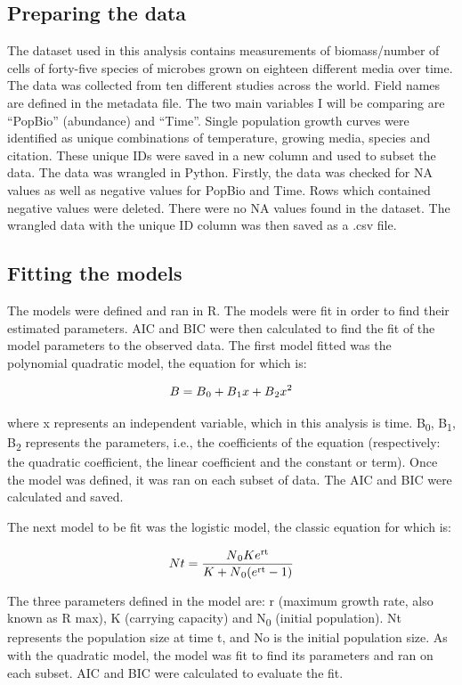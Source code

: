 \documentclass{article}
\begin{document}
\begin{flushleft}
\subsection{Preparing the data}
The dataset used in this analysis contains measurements of biomass/number of cells of forty-five species of microbes grown on eighteen different media over time. The data was collected from ten different studies across the world. Field names are defined in the metadata file. The two main variables I will be comparing are “PopBio” (abundance) and “Time”. Single population growth curves were identified as unique combinations of temperature, growing media, species and citation. These unique IDs were saved in a new column and used to subset the data. The data was wrangled in Python. Firstly, the data was checked for NA values as well as negative values for PopBio and Time. Rows which contained negative values were deleted. There were no NA values found in the dataset. The wrangled data with the unique ID column was then saved as a .csv file.
\linebreak

\subsection{Fitting the models}
The models were defined and ran in R. The models were fit in order to find their estimated parameters. AIC and BIC were then calculated to find the fit of the model parameters to the observed data. The first model fitted was the polynomial quadratic model, the equation for which is:

\[B = B\textsubscript{0}+B\textsubscript{1}x+B\textsubscript{2}x\textsuperscript{2}\]

where x represents an independent variable, which in this analysis is time. B\textsubscript{0}, B\textsubscript{1}, B\textsubscript{2} represents the parameters, i.e., the coefficients of the equation (respectively: the quadratic coefficient, the linear coefficient and the constant or term). Once the model was defined, it was ran on each subset of data. The AIC and BIC were calculated and saved.
\linebreak

The next model to be fit was the logistic model, the classic  equation for which is:

\[Nt = \frac{N\textsubscript{0} K e\textsuperscript{rt}}{K + N\textsubscript{0} (e\textsuperscript{rt} - 1)}\]

The three parameters defined in the model are: r (maximum growth rate, also known as R max), K (carrying capacity) and N\textsubscript{0} (initial population). Nt represents the population size at time t, and No is the initial population size. As with the quadratic model, the model was fit to find its parameters and ran on each subset. AIC and BIC were calculated to evaluate the fit.


\end{flushleft}
\end{document}
